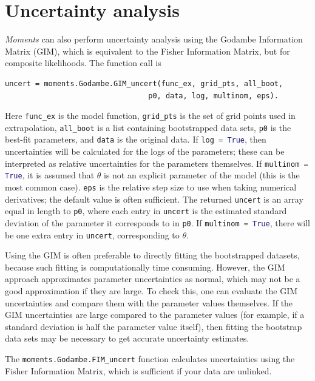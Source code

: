 \documentclass[12pt]{article}
\makeatletter
\newcommand{\py}[1]{\lstinline[breaklines=true,language=Python, showstringspaces=False]@#1@}
\makeatother
\begin{document}
\section{Uncertainty analysis}
\textit{Moments} can also perform uncertainty analysis using the Godambe Information Matrix (GIM), which is equivalent to the Fisher Information Matrix, but for composite likelihoods.
The function call is
\begin{lstlisting}
uncert = moments.Godambe.GIM_uncert(func_ex, grid_pts, all_boot,
                                 p0, data, log, multinom, eps).
\end{lstlisting}
Here \py{func_ex} is the model function, \py{grid_pts} is the set of grid points used in extrapolation, \py{all_boot} is a list containing bootstrapped data sets, \py{p0} is the best-fit parameters, and \py{data} is the original data.
If \py{log = True}, then uncertainties will be calculated for the logs of the parameters; these can be interpreted as relative uncertainties for the parameters themselves.
If \py{multinom = True}, it is assumed that $\theta$ is not an explicit parameter of the model (this is the most common case).
\py{eps} is the relative step size to use when taking numerical derivatives; the default value is often sufficient.
The returned \py{uncert} is an array equal in length to \py{p0}, where each entry in \py{uncert} is the estimated standard deviation of the parameter it corresponds to in \py{p0}.
If \py{multinom = True}, there will be one extra entry in \py{uncert}, corresponding to $\theta$.

Using the GIM is often preferable to directly fitting the bootstrapped datasets, because such fitting is computationally time consuming.
However, the GIM approach approximates parameter uncertainties as normal, which may not be a good approximation if they are large.
To check this, one can evaluate the GIM uncertainties and compare them with the parameter values themselves.
If the GIM uncertainties are large compared to the parameter values (for example, if a standard deviation is half the parameter value itself), then fitting the bootstrap data sets may be necessary to get accurate uncertainty estimates.

The \py{moments.Godambe.FIM_uncert} function calculates uncertainties using the Fisher Information Matrix, which is sufficient if your data are unlinked.
\end{document}
